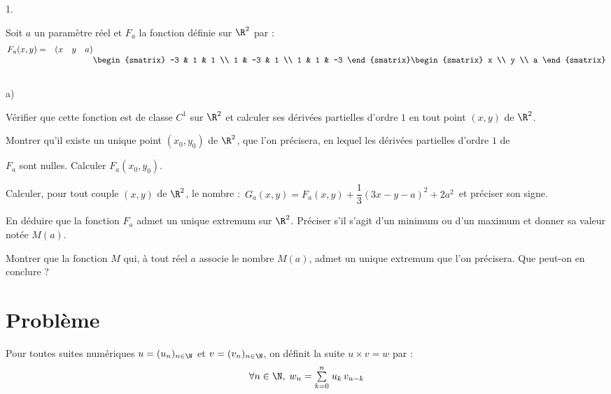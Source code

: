 \documentclass[11pt]{article}%
\begin{document}
\begin{noliste}{1.}
\item Soit $a$ un paramètre réel et $F_{a}$ la fonction définie sur
$\R^{2}$ par : 
\[
\begin{matrix}
F_{a}(x,y) = & \mathbf{(}x & y & a\mathbf{)} \\
 & & & \\
 & & & 
\end{matrix}\begin{smatrix}
-3 & 1 & 1 \\
1 & -3 & 1 \\
1 & 1 & -3
\end{smatrix}
\begin{smatrix}
x \\
y \\
a
\end{smatrix}
\]

\begin{noliste}{a)}
 \setlength{\itemsep}{2mm}
\item Vérifier que cette fonction est de classe $C^{1}$ sur $\R^{2}$
et calculer ses dérivées partielles d'ordre $1$ en tout point $(x,y)$
de $\R^{2}$.

\item Montrer qu'il existe un unique point $(x_{0},y_{0})$ de $\R^{2}
$, que l'on précisera, en lequel les dérivées partielles d'ordre $1$ de

$F_{a}$ sont nulles. Calculer $F_{a}(x_{0},y_{0})$.

\item Calculer, pour tout couple $(x,y)$ de $\R^{2}$, le nombre :\
$G_{a}(x,y) = F_{a}(x,y) + \dfrac{1}{3}(3x-y-a)^{2} + 2a^{2}$\ et
préciser son
signe.

\item En déduire que la fonction $F_{a}$ admet un unique extremum sur
$\R^{2}$. Préciser s'il s'agit d'un minimum ou d'un maximum et donner
sa valeur notée $M(a)$.

\item Montrer que la fonction $M$ qui, à tout réel $a$ associe le
nombre $M(a)$, admet un unique extremum que l'on précisera. Que peut-on
en conclure ?
\end{noliste}
\end{noliste}

\section*{Problème\ }

Pour toutes suites numériques $u = (u_{n})_{n\in \N}$ et $v =
(v_{n})_{n\in \N}$, on définit la suite $u\times v = w$ par :
\[
\forall n\in \N,\;w_{n} = \Sum{k = 0}{n}u_{k}\,v_{n-k}
\]
\vspace{-8mm} \vspace{0.3cm} \vspace{0.2cm}
\end{document}
